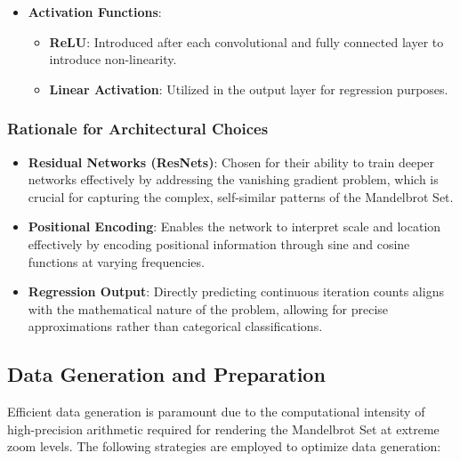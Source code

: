 \documentclass[journal]{IEEEaccess}
\begin{document}
\begin{itemize}
    \item \textbf{Activation Functions}:
    \begin{itemize}
        \item \textbf{ReLU}: Introduced after each convolutional and fully connected layer to introduce non-linearity.
        \item \textbf{Linear Activation}: Utilized in the output layer for regression purposes.
    \end{itemize}
\end{itemize}

\subsubsection{Rationale for Architectural Choices}
\begin{itemize}
    \item \textbf{Residual Networks (ResNets)}: Chosen for their ability to train deeper networks effectively by addressing the vanishing gradient problem, which is crucial for capturing the complex, self-similar patterns of the Mandelbrot Set.
    
    \item \textbf{Positional Encoding}: Enables the network to interpret scale and location effectively by encoding positional information through sine and cosine functions at varying frequencies.
    
    \item \textbf{Regression Output}: Directly predicting continuous iteration counts aligns with the mathematical nature of the problem, allowing for precise approximations rather than categorical classifications.
\end{itemize}

\subsection{Data Generation and Preparation}
Efficient data generation is paramount due to the computational intensity of high-precision arithmetic required for rendering the Mandelbrot Set at extreme zoom levels. The following strategies are employed to optimize data generation:
\end{document}

